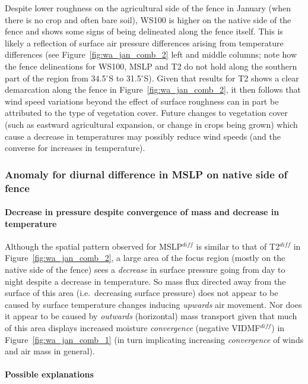 Despite lower roughness on the agricultural side of the fence in January (when there is no crop and often bare soil), \ac{WS100} is higher on the native side of the fence and shows some signs of being delineated along the fence itself. This is likely a reflection of surface air pressure differences arising from temperature differences (see Figure~\ref{fig:wa_jan_comb_2} left and middle columns; note how the fence delineations for \ac{WS100}, \ac{MSLP} and \ac{T2} do not hold along the southern part of the region from 34.5$^\circ$S to 31.5$^\circ$S). Given that results for \ac{T2} shows a clear demarcation along the fence in Figure~\ref{fig:wa_jan_comb_2}, it then follows that wind speed variations beyond the effect of surface roughness can in part be attributed to the type of vegetation cover. Future changes to vegetation cover (such as eastward agricultural expansion, or change in crops being grown) which cause a decrease in temperatures may possibly reduce wind speeds (and the converse for increases in temperature).

\subsubsection{Anomaly for diurnal difference in MSLP on native side of fence}

\paragraph{Decrease in pressure despite convergence of mass and decrease in temperature}

Although the spatial pattern observed for \ac{MSLP}$^{diff}$ is similar to that of \ac{T2}$^{diff}$ in Figure~\ref{fig:wa_jan_comb_2}, a large area of the focus region (mostly on the native side of the fence) sees a \textit{decrease} in surface pressure going from day to night despite a decrease in temperature. So mass flux directed away from the surface of this area (i.e.\ decreasing surface pressure) does not appear to be caused by surface temperature changes inducing \textit{upwards} air movement. Nor does it appear to be caused by \textit{outwards} (horizontal) mass transport given that much of this area displays increased moisture \textit{convergence} (negative \acs{VIDMF}$^{diff}$) in Figure~\ref{fig:wa_jan_comb_1} (in turn implicating increasing \textit{convergence} of winds and air mass in general).

\paragraph{Possible explanations}

